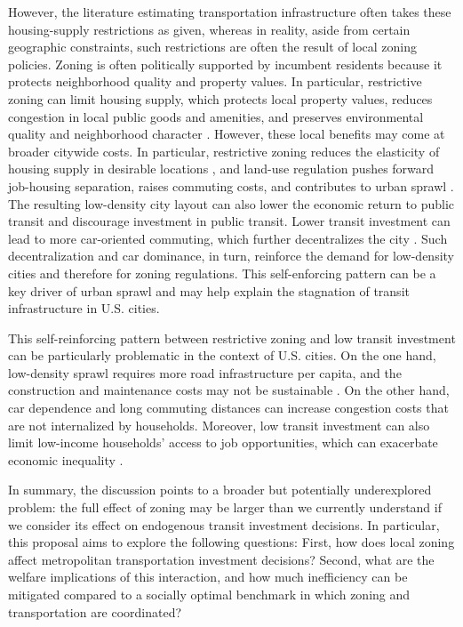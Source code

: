 \documentclass[12pt, a4paper]{article}
\begin{document}
However, the literature estimating transportation infrastructure often takes these housing-supply restrictions as given, whereas in reality, aside from certain geographic constraints, such restrictions are often the result of local zoning policies. Zoning is often politically supported by incumbent residents because it protects neighborhood quality and property values. In particular, restrictive zoning can limit housing supply, which protects local property values, reduces congestion in local public goods and amenities, and preserves environmental quality and neighborhood character \citep{Rollet2025-mk}. However, these local benefits may come at broader citywide costs. In particular, restrictive zoning reduces the elasticity of housing supply in desirable locations \citep{Glaeser2002-vq}, and land-use regulation pushes forward job-housing separation, raises commuting costs, and contributes to urban sprawl \citep{Glaeser2003-sr}. The resulting low-density city layout can also lower the economic return to public transit and discourage investment in public transit. Lower transit investment can lead to more car-oriented commuting, which further decentralizes the city \citep{Baum-Snow2007-zj}. Such decentralization and car dominance, in turn, reinforce the demand for low-density cities and therefore for zoning regulations. This self-enforcing pattern can be a key driver of urban sprawl and may help explain the stagnation of transit infrastructure in U.S. cities.    

This self-reinforcing pattern between restrictive zoning and low transit investment can be particularly problematic in the context of U.S. cities. On the one hand, low-density sprawl requires more road infrastructure per capita, and the construction and maintenance costs may not be sustainable \citep{Brueckner2000-vd}. On the other hand, car dependence and long commuting distances can increase congestion costs that are not internalized by households. Moreover, low transit investment can also limit low-income households' access to job opportunities, which can exacerbate economic inequality \citep{Glaeser2008-xq}.

In summary, the discussion points to a broader but potentially underexplored problem: the full effect of zoning may be larger than we currently understand if we consider its effect on endogenous transit investment decisions. In particular, this proposal aims to explore the following questions: First, how does local zoning affect metropolitan transportation investment decisions? Second, what are the welfare implications of this interaction, and how much inefficiency can be mitigated compared to a socially optimal benchmark in which zoning and transportation are coordinated?
\end{document}

